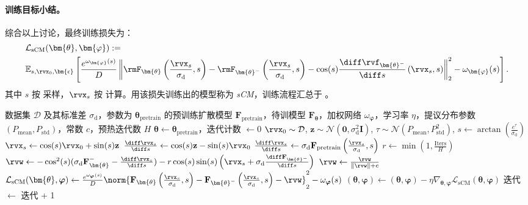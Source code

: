 \paragraph{训练目标小结。}综合以上讨论，最终训练损失为：
\begin{align*}
    &\mathcal{L}_{\text{sCM}}(\bm{\theta}, \bm{\varphi})
    := \\&\mathbb{E}_{s, \rvx_0, \bm{\epsilon}} \left[
    \frac{e^{\omega_{\bm{\varphi}}(s)}}{D}
    \left\|
    \rmF_{\bm{\theta}}\left(\frac{\rvx_s}{\sigma_{\mathrm{d}}}, s\right)
    - \rmF_{\bm{\theta}^-}\left(\frac{\rvx_s}{\sigma_{\mathrm{d}}}, s\right)
    - \cos(s) \frac{\diff \rvf_{\bm{\theta}^-}}{\diff s}\left(\rvx_s, s\right)
    \right\|_2^2
    - \omega_{\bm{\varphi}}(s)
    \right].
\end{align*}
其中 $s$ 按  采样，$\rvx_s$ 按  计算。用该损失训练出的模型称为 \emph{sCM}，训练流程汇总于 。


\begin{algorithm}[tb]
{\small
\caption{连续时间一致性模型（sCM）的训练流程 \label{alg:scm}}
\begin{algorithmic}[1]
\Require 数据集 $\mathcal{D}$ 及其标准差 $\sigma_{\mathrm{d}}$，参数为 $\bm{\theta}_{\text{pretrain}}$ 的预训练扩散模型 $\mathbf{F}_{\text{pretrain}}$，待训模型 $\mathbf{F}_{\bm{\theta}}$，加权网络 $\omega_{\boldsymbol{\varphi}}$，学习率 $\eta$，提议分布参数 $(P_{\text{mean}}, P_{\text{std}})$，常数 $c$，预热迭代数 $H$
\State {} $\bm{\theta} \gets \bm{\theta}_{\text{pretrain}}$，迭代计数 $\gets 0$
\Repeat
    \State $\rvx_0 \sim \mathcal{D}$, $\mathbf{z} \sim \mathcal{N}(\bm{0}, \sigma_{\mathrm{d}}^2 \mathbf{I})$, $\tau \sim \mathcal{N}(P_{\text{mean}}, P_{\text{std}}^2)$, $s \gets \arctan\left(\frac{e^\tau}{\sigma_{\mathrm{d}}}\right)$
    \State $\rvx_s \gets \cos(s) \rvx_0 + \sin(s) \mathbf{z}$
        \State $\frac{\diff\rvx_s}{\diff s} \gets \cos(s) \mathbf{z} - \sin(s) \rvx_0$
    \Else
        \State $\frac{\diff\rvx_s}{\diff s} \gets \sigma_{\mathrm{d}} \mathbf{F}_{\text{pretrain}}\left(\frac{\rvx_s}{\sigma_{\mathrm{d}}}, s\right)$
    \EndIf
    \State $r \gets \min\left(1, \frac{\text{Iters}}{H}\right)$ \hfill {}
    \State $\rvw \gets - \cos^2(s) (\sigma_{\mathrm{d}} \mathbf{F}_{\bm{\theta}}^{-} - \frac{\diff\rvx_s}{\diff s}) - r  \cos(s) \sin(s) \left(\rvx_s + \sigma_{\mathrm{d}} \frac{\diff\mathbf{F}_{\bm{\theta}^-}}{\diff s}\right)$
    \State $\rvw \gets \frac{\rvw}{\|\rvw\| + c}$ \hfill {}
    \State $\mathcal{L}_{\text{sCM}}(\bm{\theta}, \boldsymbol{\varphi}) \gets\frac{e^{\omega_{\boldsymbol{\varphi}}(s)}}{D} \norm{ \mathbf{F}_{\bm{\theta}}\left( \frac{\rvx_s}{\sigma_{\mathrm{d}}}, s\right) - \mathbf{F}_{\bm{\theta}^{-}}\left( \frac{\rvx_s}{\sigma_{\mathrm{d}}}, s\right) - \rvw }^2_2 - \omega_{\boldsymbol{\varphi}}(s)$
    \Statex  \hfill {}
    \State $(\bm{\theta}, \boldsymbol{\varphi}) \gets (\bm{\theta}, \boldsymbol{\varphi}) - \eta \nabla_{\bm{\theta}, \boldsymbol{\varphi}} \mathcal{L}_{\text{sCM}}(\bm{\theta}, \boldsymbol{\varphi})$
    \State 迭代 $\gets$ 迭代 + 1
\end{algorithmic}
}
\end{algorithm}


